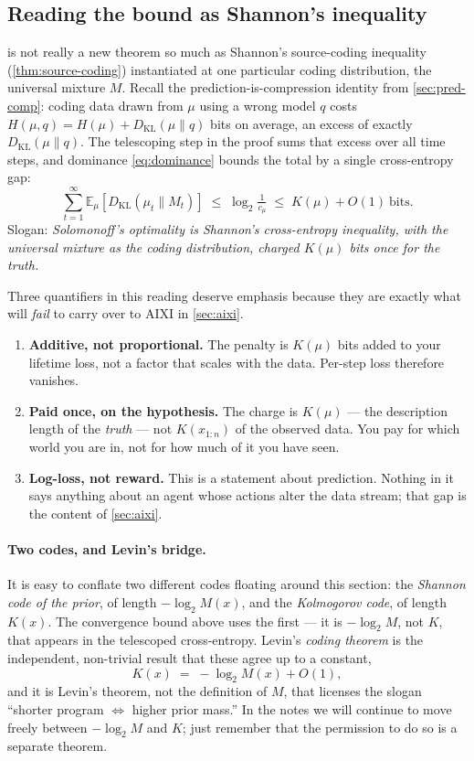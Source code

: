 \documentclass[12pt,a4paper]{article}
\theoremstyle{plain}
\theoremstyle{definition}
\begin{document}
\subsection*{Reading the bound as Shannon's inequality}

 is not really a new theorem so much as Shannon's
source-coding inequality (\cref{thm:source-coding})
instantiated at one particular coding distribution, the universal
mixture $M$.  Recall the prediction-is-compression identity from
\cref{sec:pred-comp}: coding data drawn from $\mu$ using a wrong
model $q$ costs
$H(\mu,q) = H(\mu) + D_{\mathrm{KL}}(\mu\|q)$ bits on average, an
excess of exactly $D_{\mathrm{KL}}(\mu\|q)$.  The telescoping step in
the proof sums that excess over all time steps, and dominance
\eqref{eq:dominance} bounds the total by a single cross-entropy gap:
\[
  \sum_{t=1}^{\infty}
    \mathbb{E}_\mu\!\left[D_{\mathrm{KL}}(\mu_t\|M_t)\right]
  \;\le\; \log_2 \tfrac{1}{c_\mu}
  \;\le\; K(\mu) + O(1)\ \text{bits}.
\]
Slogan: \emph{Solomonoff's optimality is Shannon's cross-entropy
inequality, with the universal mixture as the coding distribution,
charged $K(\mu)$ bits once for the truth.}

Three quantifiers in this reading deserve emphasis because they are
exactly what will \emph{fail} to carry over to AIXI in
\cref{sec:aixi}.
\begin{enumerate}
  \item \textbf{Additive, not proportional.}  The penalty is $K(\mu)$
    bits added to your lifetime loss, not a factor that scales with
    the data.  Per-step loss therefore vanishes.
  \item \textbf{Paid once, on the hypothesis.}  The charge is
    $K(\mu)$ --- the description length of the \emph{truth} --- not
    $K(x_{1:n})$ of the observed data.  You pay for which world you
    are in, not for how much of it you have seen.
  \item \textbf{Log-loss, not reward.}  This is a statement about
    prediction.  Nothing in it says anything about an agent whose
    actions alter the data stream; that gap is the content of
    \cref{sec:aixi}.
\end{enumerate}

\paragraph{Two codes, and Levin's bridge.}  It is easy to conflate
two different codes floating around this section: the \emph{Shannon
code of the prior}, of length $-\log_2 M(x)$, and the
\emph{Kolmogorov code}, of length $K(x)$.  The convergence bound
above uses the first --- it is $-\log_2 M$, not $K$, that appears in
the telescoped cross-entropy.  Levin's \emph{coding theorem} is the
independent, non-trivial result that these agree up to a constant,
\[
  K(x) \;=\; -\log_2 M(x) + O(1),
\]
and it is Levin's theorem, not the definition of $M$, that licenses
the slogan ``shorter program $\Leftrightarrow$ higher prior mass.''
In the notes we will continue to move freely between $-\log_2 M$ and
$K$; just remember that the permission to do so is a separate
theorem.
\end{document}
